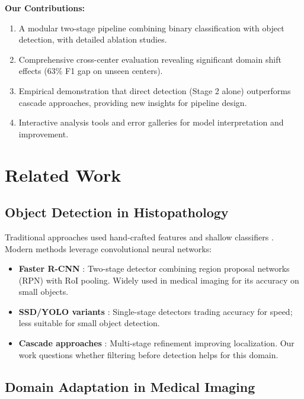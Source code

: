 \documentclass[11pt,a4paper]{article}
\begin{document}
\textbf{Our Contributions:}
\begin{enumerate}
    \item A modular two-stage pipeline combining binary classification with 
          object detection, with detailed ablation studies.
    \item Comprehensive cross-center evaluation revealing significant domain shift 
          effects (63\% F1 gap on unseen centers).
    \item Empirical demonstration that direct detection (Stage 2 alone) outperforms 
          cascade approaches, providing new insights for pipeline design.
    \item Interactive analysis tools and error galleries for model interpretation 
          and improvement.
\end{enumerate}

\section{Related Work}

\subsection{Object Detection in Histopathology}

Traditional approaches used hand-crafted features and shallow classifiers 
\cite{Veta2013}. Modern methods leverage convolutional neural networks:

\begin{itemize}
    \item \textbf{Faster R-CNN} \cite{Ren2015}: Two-stage detector combining region 
          proposal networks (RPN) with RoI pooling. Widely used in medical imaging 
          for its accuracy on small objects.
    
    \item \textbf{SSD/YOLO variants} \cite{Liu2016,Redmon2016}: Single-stage detectors 
          trading accuracy for speed; less suitable for small object detection.
    
    \item \textbf{Cascade approaches} \cite{Cai2018}: Multi-stage refinement improving 
          localization. Our work questions whether filtering before detection helps 
          for this domain.
\end{itemize}

\subsection{Domain Adaptation in Medical Imaging}
\end{document}
